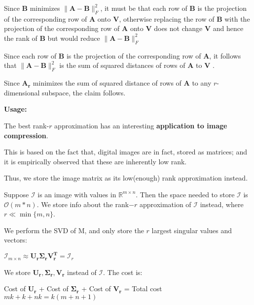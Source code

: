 \documentclass[fleqn, 11pt]{article}
\newcommand{\bs}[1]{\boldsymbol{#1}}
\newcommand{\R}[0]{\mathbb{R}}
\begin{document}
\medskip

Since  $\bs{B}$ minimizes $ \|\bs{A}-\bs{B}\|^2_F$, it must be that each row of $\bs{B}$ is the projection of the corresponding row of $\bs{A}$ onto $\bs{V}$, otherwise replacing the row of $\bs{B}$ with the projection of the corresponding row of $\bs{A}$ onto $\bs{V}$
does not change $\bs{V}$ and hence the rank of $\bs{B}$ but would reduce $ \|\bs{A}-\bs{B}\|^2_F$

\smallskip

Since each row
of $\bs{B}$ is the projection of the corresponding row of $\bs{A}$, it follows that $ \|\bs{A}-\bs{B}\|^2_F$ is the sum
of squared distances of rows of  $\bs{A}$  to  $\bs{V}$ .  

\smallskip

Since $\bs{A_r}$   minimizes 
the sum of squared distance
of rows of $\bs{A}$  to any $r$-dimensional subspace, the claim follows. 

\hrulefill

\bigskip 

\textbf{Usage: }

\medskip

The best rank-$r$
approximation has an interesting \textbf{application to image compression}. 

\smallskip

This is based on the fact that, digital images are in fact, stored as matrices; and it is 
empirically observed that these are inherently low rank.

\smallskip

Thus, we store the image matrix as its low(enough) rank approximation instead. 

\smallskip

Suppose $\mathcal{I}$ is an image with values in $\R^{m \times n}$. Then the space needed to store $\mathcal{I}$  
is $\mathcal{O}(m*n)$. We store info about the rank$-r$ approximation of 
$\mathcal{I}$ instead, where $r \ll \min\{m,n\}$. 

\smallskip

We perform the SVD of M, and only store the $r$ largest singular values and vectors:

\begin{center}
    $\mathcal{I}_{m \times n} \approx \bs{U_r \Sigma_r V_r ^T } = \mathcal{I}_r  $
\end{center}

We store $\bs{U_r,  \Sigma_r,  V_r }$ instead of  $\mathcal{I}$. The cost is:

\begin{center}
    Cost of $\bs{U_r}$ +  Cost of $\bs{\Sigma_r}$ +  Cost of $\bs{V_r}$  = Total cost \\
    $mk + k + nk = k (m+n+1)$
\end{center}
\end{document}
